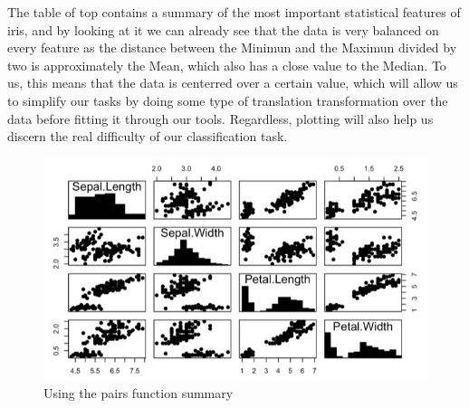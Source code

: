 \documentclass[12pt]{report}
\begin{document}
The table of top contains a summary of the most important statistical features of iris, and by looking at it we can already see that the data is very balanced on every feature as the distance between the Minimun and the Maximun divided by two is approximately the Mean, which also has a close value to the Median. To us, this means that the data is centerred over a certain value, which will allow us to simplify our tasks by doing some type of translation transformation over the data before fitting it through our tools. Regardless, plotting will also help us discern the real difficulty of our classification task.

\begin{figure}[H]
	\centering
	\includegraphics[width=13cm]{Figuras_tfg/Figure_Iris_Histogram}
	\caption{Using the pairs function summary}
	\label{fig:figure_pairs_iris}
\end{figure}
\end{document}
